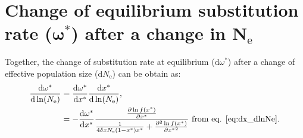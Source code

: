 \documentclass{article}
\newcommand{\der}{\mathrm{d}}
\newcommand{\Ne}{N_{\mathrm{e}}}
\newcommand{\dnds}{\omega}
\newcommand{\x}{x}
\newcommand{\eq}{^{*}}
\newcommand{\dx}{\delta \x}
\begin{document}
\section*{Change of equilibrium substitution rate ($\bm{\dnds\eq}$) after a change in $\bm{\Ne}$}
Together, the change of substitution rate at equilibrium ($\der \dnds\eq$) after a change of effective population size ($\der \Ne$) can be obtain as:
\begin{align}
\frac{\der \dnds\eq}{\der \ln (\Ne)} & = \frac{\der \dnds\eq}{\der \x\eq} \frac{ \der \x\eq}{\der \ln (\Ne)}, \\
 &= - \frac{\der \dnds\eq}{\der \x\eq} \frac{\frac{ \partial \ln f(\x\eq) }{\partial {\x\eq}}}{\frac{1}{4 \dx \Ne  (1 - \x\eq) \x\eq} + \frac{ \partial^2 \ln f(\x\eq) }{\partial {\x\eq}^2}} \text{ from eq. \ref{eq:dx_dlnNe}} \label{eq:dw_dlnNe}.
\end{align}
\end{document}
